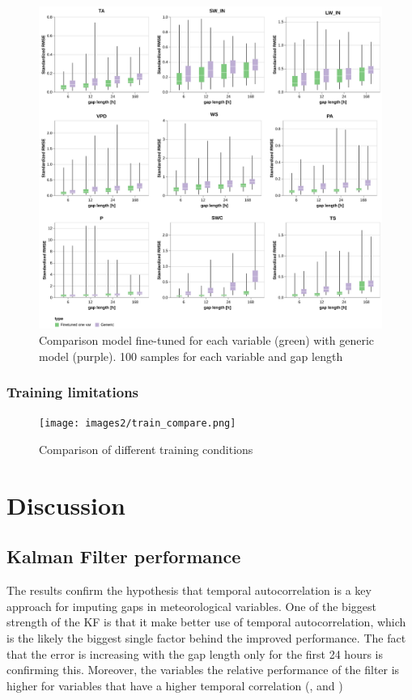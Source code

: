 \documentclass{article}
\newcommand{\imgwidth}{6in}
\let\Oldsection\section
\renewcommand{\section}{\FloatBarrier\Oldsection}
\let\Oldsubsection\subsection
\renewcommand{\subsection}{\FloatBarrier\Oldsubsection}
\begin{document}
\begin{figure}
\centerline{\includegraphics[width=\imgwidth]{images2/generic.png}}
\caption{Comparison model fine-tuned for each variable (green) with generic model (purple). 100 samples for each variable and gap length}
\label{fig:generic}
\end{figure}

\subsubsection{Training limitations}

\begin{figure}
\centerline{\texttt{[image: images2/train\_compare.png]}}
\caption{Comparison of different training conditions}
\label{fig:train_compare}
\end{figure}


\section{Discussion}




\subsection{Kalman Filter performance}

The results confirm the hypothesis that temporal autocorrelation is a key approach for imputing gaps in meteorological variables. One of the biggest strength of the KF is that it make better use of temporal autocorrelation, which is the likely the biggest single factor behind the improved performance. The fact that the error is increasing with the gap length only for the first 24 hours is confirming this. Moreover, the variables the relative performance of the filter is higher for variables that have a higher temporal correlation (,  and )
\end{document}
